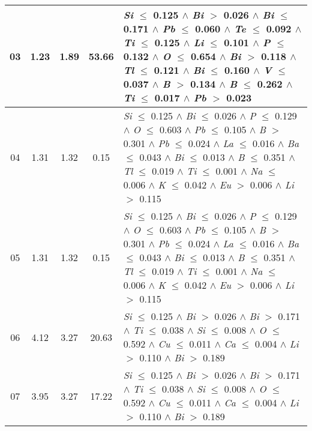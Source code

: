 \begin{table}[!htbp]
\begin{tabular}{ccccm{}}
		\hline
		03 & 1.23 & 1.89 & 53.66 & \textit{Si} $\le$ 0.125 $\wedge$ \textit{Bi} $>$ 0.026 $\wedge$ \textit{Bi} $\le$ 0.171 $\wedge$ \textit{Pb} $\le$ 0.060 $\wedge$ \textit{Te} $\le$ 0.092 $\wedge$ \textit{Ti} $\le$ 0.125 $\wedge$ \textit{Li} $\le$ 0.101 $\wedge$ \textit{P} $\le$ 0.132 $\wedge$ \textit{O} $\le$ 0.654 $\wedge$ \textit{Bi} $>$ 0.118 $\wedge$ \textit{Tl} $\le$ 0.121 $\wedge$ \textit{Bi} $\le$ 0.160 $\wedge$ \textit{V} $\le$ 0.037 $\wedge$ \textit{B} $>$ 0.134 $\wedge$ \textit{B} $\le$ 0.262 $\wedge$ \textit{Ti} $\le$ 0.017 $\wedge$ \textit{Pb} $>$ 0.023\\
		\hline
		04 & 1.31 & 1.32 & 0.15 & \textit{Si} $\le$ 0.125 $\wedge$ \textit{Bi} $\le$ 0.026 $\wedge$ \textit{P} $\le$ 0.129 $\wedge$ \textit{O} $\le$ 0.603 $\wedge$ \textit{Pb} $\le$ 0.105 $\wedge$ \textit{B} $>$ 0.301 $\wedge$ \textit{Pb} $\le$ 0.024 $\wedge$ \textit{La} $\le$ 0.016 $\wedge$ \textit{Ba} $\le$ 0.043 $\wedge$ \textit{Bi} $\le$ 0.013 $\wedge$ \textit{B} $\le$ 0.351 $\wedge$ \textit{Tl} $\le$ 0.019 $\wedge$ \textit{Ti} $\le$ 0.001 $\wedge$ \textit{Na} $\le$ 0.006 $\wedge$ \textit{K} $\le$ 0.042 $\wedge$ \textit{Eu} $>$ 0.006 $\wedge$ \textit{Li} $>$ 0.115\\
		\hline
		05 & 1.31 & 1.32 & 0.15 & \textit{Si} $\le$ 0.125 $\wedge$ \textit{Bi} $\le$ 0.026 $\wedge$ \textit{P} $\le$ 0.129 $\wedge$ \textit{O} $\le$ 0.603 $\wedge$ \textit{Pb} $\le$ 0.105 $\wedge$ \textit{B} $>$ 0.301 $\wedge$ \textit{Pb} $\le$ 0.024 $\wedge$ \textit{La} $\le$ 0.016 $\wedge$ \textit{Ba} $\le$ 0.043 $\wedge$ \textit{Bi} $\le$ 0.013 $\wedge$ \textit{B} $\le$ 0.351 $\wedge$ \textit{Tl} $\le$ 0.019 $\wedge$ \textit{Ti} $\le$ 0.001 $\wedge$ \textit{Na} $\le$ 0.006 $\wedge$ \textit{K} $\le$ 0.042 $\wedge$ \textit{Eu} $>$ 0.006 $\wedge$ \textit{Li} $>$ 0.115\\
		\hline
		06 & 4.12 & 3.27 & 20.63 & \textit{Si} $\le$ 0.125 $\wedge$ \textit{Bi} $>$ 0.026 $\wedge$ \textit{Bi} $>$ 0.171 $\wedge$ \textit{Ti} $\le$ 0.038 $\wedge$ \textit{Si} $\le$ 0.008 $\wedge$ \textit{O} $\le$ 0.592 $\wedge$ \textit{Cu} $\le$ 0.011 $\wedge$ \textit{Ca} $\le$ 0.004 $\wedge$ \textit{Li} $>$ 0.110 $\wedge$ \textit{Bi} $>$ 0.189\\
		\hline
		07 & 3.95 & 3.27 & 17.22 & \textit{Si} $\le$ 0.125 $\wedge$ \textit{Bi} $>$ 0.026 $\wedge$ \textit{Bi} $>$ 0.171 $\wedge$ \textit{Ti} $\le$ 0.038 $\wedge$ \textit{Si} $\le$ 0.008 $\wedge$ \textit{O} $\le$ 0.592 $\wedge$ \textit{Cu} $\le$ 0.011 $\wedge$ \textit{Ca} $\le$ 0.004 $\wedge$ \textit{Li} $>$ 0.110 $\wedge$ \textit{Bi} $>$ 0.189\\

\end{tabular}
\end{table}
